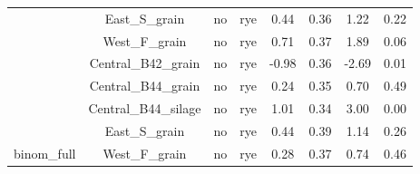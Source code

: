 \documentclass[
]{article}
\begin{document}
\begin{table}[H]
\begin{tabular}[t]{cccccccc}
 & East\_S\_grain & no & rye & 0.44 & 0.36 & 1.22 & 0.22\\

\rowcolor{gray!6}  \multirow{-5}{*}{\centering\arraybackslash binom\_out-rm} & West\_F\_grain & no & rye & 0.71 & 0.37 & 1.89 & 0.06\\
\cmidrule{1-8}
 & Central\_B42\_grain & no & rye & -0.98 & 0.36 & -2.69 & 0.01\\

\rowcolor{gray!6}   & Central\_B44\_grain & no & rye & 0.24 & 0.35 & 0.70 & 0.49\\

 & Central\_B44\_silage & no & rye & 1.01 & 0.34 & 3.00 & 0.00\\

\rowcolor{gray!6}   & East\_S\_grain & no & rye & 0.44 & 0.39 & 1.14 & 0.26\\

\multirow{-5}{*}{\centering\arraybackslash binom\_full} & West\_F\_grain & no & rye & 0.28 & 0.37 & 0.74 & 0.46\\
\bottomrule
\end{tabular}
\end{table}
\end{document}
